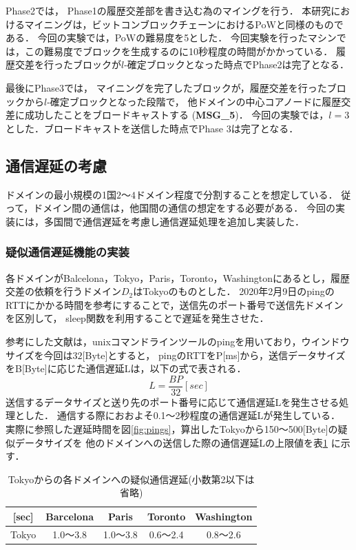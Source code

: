 \documentclass[a4paper,12pt]{jsarticle}
\begin{document}
Phase2では，
Phase1の履歴交差部を書き込む為のマイングを行う．
本研究におけるマイニングは，ビットコンブロックチェーンにおけるPoWと同様のものである．
今回の実験では，PoWの難易度を5とした．
今回実験を行ったマシンでは，この難易度でブロックを生成するのに10秒程度の時間がかかっている．
履歴交差を行ったブロックが$l$-確定ブロックとなった時点でPhase2は完了となる．

最後にPhase3では，
マイニングを完了したブロックが，履歴交差を行ったブロックから$l$-確定ブロックとなった段階で，
他ドメインの中心コアノードに履歴交差に成功したことをブロードキャストする
 (\textbf{MSG\_5})．
今回の実験では，$l=3$とした．ブロードキャストを送信した時点でPhase 3は完了となる．

\subsection{通信遅延の考慮}
ドメインの最小規模の1国$2$〜$4$ドメイン程度で分割することを想定している．
従って，ドメイン間の通信は，他国間の通信の想定をする必要がある．
今回の実装には，多国間で通信遅延を考慮し通信遅延処理を追加し実装した．

\subsubsection{疑似通信遅延機能の実装}
各ドメインがBalcelona，Tokyo，Paris，Toronto，Washingtonにあるとし，履歴交差の依頼を行うドメイン$D_2$はTokyoのものとした．
2020年2月9日のpingのRTTにかかる時間\cite{pings}を参考にすることで，送信先のポート番号で送信先ドメインを区別して，
sleep関数を利用することで遅延を発生させた．

参考にした文献\cite{pings}は，unixコマンドラインツールのpingを用いており，ウインドウサイズを今回は$32$[Byte]とすると，
pingのRTTをP[ms]から，送信データサイズをB[Byte]に応じた通信遅延Lは，以下の式で表される．
\begin{equation}
  \label{byt}
    L = \frac{BP}{32} [sec]
\end{equation}
送信するデータサイズと送り先のポート番号に応じて通信遅延Lを発生させる処理とした．
通信する際におおよそ0.1〜2秒程度の通信遅延Lが発生している．
実際に参照した遅延時間を図\ref{fig:pings}，算出したTokyoから150〜500[Byte]の疑似データサイズを
他のドメインへの送信した際の通信遅延Lの上限値を表\ref{Byte} に示す．

\begin{table}[H]%
  \centering
  \caption{Tokyoからの各ドメインへの疑似通信遅延(小数第2以下は省略)}
  \label{Byte}
  \begin{tabular}{c|c|c|c|c|}
  \cline{2-5}
  [sec]                       & Barcelona &    Paris   &   Toronto  & Washington \\ \hline
  \multicolumn{1}{|c|}{Tokyo} &  1.0〜3.8 &  1.0〜3.8  &  0.6〜2.4  &  0.8〜2.6  \\ \hline
  \end{tabular}
\end{table}
\end{document}
